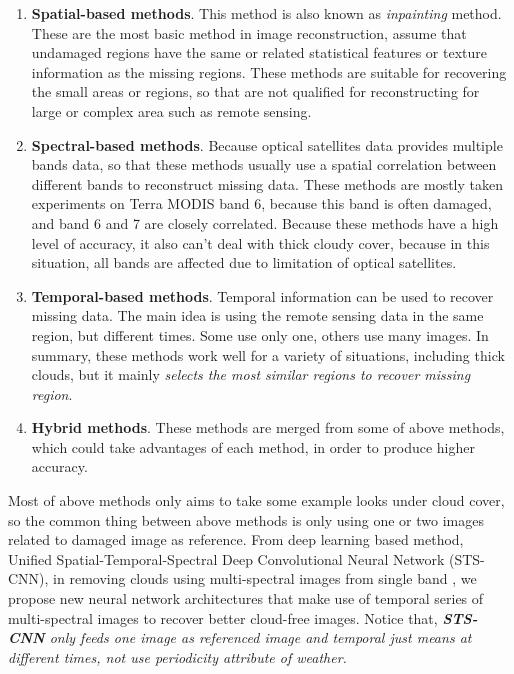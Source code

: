 \begin{enumerate}
	\item \textbf{Spatial-based methods}\cite{Zhang2006,YangLLSWL16}. This method is also known as \textit{inpainting} method. These are the most basic method in image reconstruction, assume that undamaged regions have the same or related statistical features or texture information as the missing regions. These methods are suitable for recovering the small areas or regions, so that are not qualified for reconstructing for large or complex area such as remote sensing.
	
	\item \textbf{Spectral-based methods}\cite{Lingli2006,Li2014}. Because optical satellites data provides multiple bands data, so that these methods usually use a spatial correlation between different bands to reconstruct missing data. These methods are mostly taken experiments on Terra MODIS band 6, because this band is often damaged, and band 6 and 7 are closely correlated. Because these methods have a high level of accuracy, it also can't deal with thick cloudy cover, because in this situation, all bands are affected due to limitation of optical satellites.
	
	\item \textbf{Temporal-based methods}\cite{ZENG2013182,Gao2017}. Temporal information can be used to recover missing data. The main idea is using the remote sensing data in the same region, but different times. Some use only one, others use many images. In summary, these methods work well for a variety of situations, including thick clouds, but it mainly \textit{selects the most similar regions to recover missing region}.
	
	\item \textbf{Hybrid methods}\cite{Ng2017,Li2016}. These methods are merged from some of above methods, which could take advantages of each method, in order to produce higher accuracy. 
\end{enumerate}

Most of above methods only aims to take some example looks under cloud cover, so the common thing between above methods is only using one or two images related to damaged image as reference. From deep learning based method, Unified Spatial-Temporal-Spectral Deep Convolutional Neural Network (STS-CNN), in removing clouds using multi-spectral images from single band \cite{Zhang2018}, we propose new neural network architectures that make use of temporal series of multi-spectral images to recover better cloud-free images. Notice that, \textit{\textbf{STS-CNN} only feeds one image as referenced image and \textit{temporal} just means \textit{at different times}, not use periodicity attribute of weather.}

